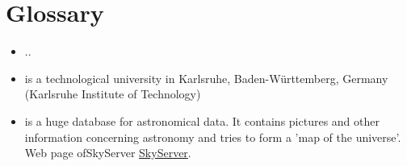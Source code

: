 \section{Glossary}\label{glos}





\printglossary

\begin{itemize}
  
  \item[\textbf{..}] .. \label{..}
  
  
  \item[\textbf{KIT}] is a technological university in Karlsruhe, Baden-Württemberg, Germany 
              (Karlsruhe Institute of Technology)\label{KIT}
  
  
  \item[\textbf{SkyServer}] is a huge database for astronomical data. It contains pictures
              and other information concerning astronomy and tries to form a 
              'map of the universe'. Web page of\label{SkyServer}{SkyServer}
               \href{http://skyserver.sdss.org/public/en/}{SkyServer}.
   
  
  
  
\end{itemize}